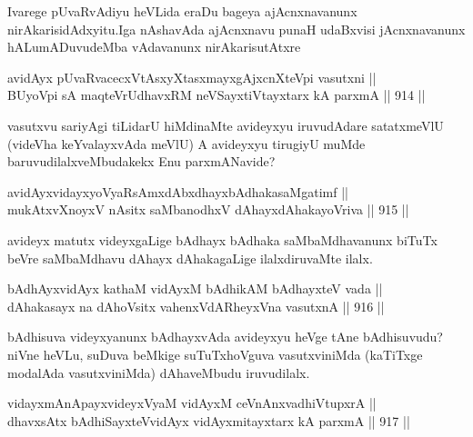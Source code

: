 \begin{artha}
Ivarege pUvaRvAdiyu heVLida eraDu bageya ajAcnxnavanunx nirAkarisidAdxyitu.Iga nAshavAda ajAcnxnavu  punaH udaBxvisi jAcnxnavanunx hALumADuvudeMba vAdavanunx nirAkarisutAtxre\ndash 
\end{artha}

\begin{shl}
avidAyx pUvaRvacecxVtAsxyXtasxmayxgAjxcnXteV\s pi vasutxni || \\
BUyoV\s pi sA maqteVrUdhavxRM neVSayxtiVtayxtarx kA parxmA \hfill || 914 ||  
\end{shl}

\begin{artha}
vasutxvu sariyAgi tiLidarU hiMdinaMte avideyxyu iruvudAdare satatxmeVlU (videVha keYvalayxvAda meVlU) A avideyxyu tirugiyU muMde baruvudilalxveMbudakekx Enu parxmANavide?
\end{artha}

\begin{shl}
avidAyxvidayxyoVyaRsAmxdAbxdhayxbAdhakasaMgatimf || \\
mukAtxvX\s noyxV nAsitx saMbanodhxV dAhayxdAhakayoVriva \hfill || 915 || 
\end{shl}

\begin{artha}
avideyx matutx videyxgaLige bAdhayx bAdhaka saMbaMdhavanunx biTuTx beVre saMbaMdhavu dAhayx dAhakagaLige ilalxdiruvaMte ilalx.
\end{artha}


\begin{shl}
bAdhAyx\s vidAyx kathaM vidAyxM bAdhikAM bAdhayxteV vada ||  \\
dAhakasayx na dAhoV\s sitx vahenxVdARheyxVna vasutxnA \hfill || 916 ||  
\end{shl}

\begin{artha}
bAdhisuva videyxyanunx bAdhayxvAda avideyxyu heVge tAne bAdhisuvudu? niVne heVLu, suDuva beMkige suTuTxhoVguva vasutxviniMda (kaTiTxge modalAda vasutxviniMda) dAhaveMbudu iruvudilalx.
\end{artha}


\begin{shl}
vidayxmAnA\s payxvideyxVyaM vidAyxM ceVnAnxvadhiVtupxrA || \\
dhavxsAtx bAdhiSayxteV\s vidAyx vidAyxmitayxtarx kA parxmA \hfill || 917 ||  
\end{shl}

